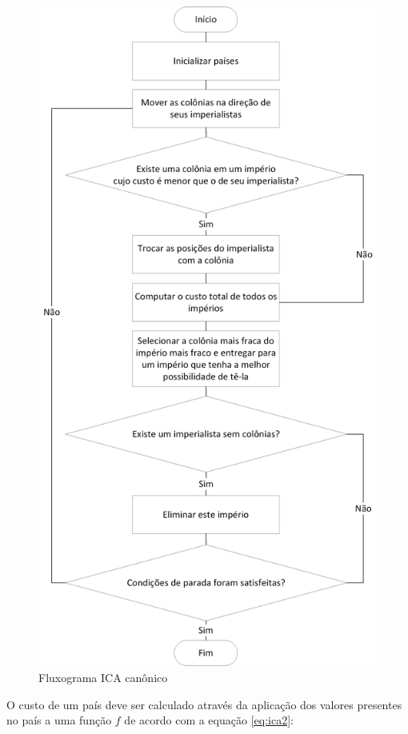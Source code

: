 \begin{figure}[h]
	\centering	
	\includegraphics[scale=0.55]{Figuras/Fluxograms-ICACanonic.png}
	\caption{Fluxograma ICA canônico}
	\label{fig:Fluxograms-ICACanonic}
	\end{figure}

O custo de um país deve ser calculado através da aplicação dos valores presentes no país a uma função \(f\) de acordo com a equação \ref{eq:ica2}:

